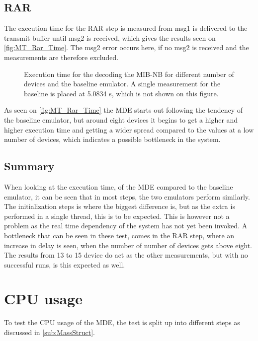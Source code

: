 \subsection{RAR}
The execution time for the RAR step is measured from msg1 is delivered to the transmit buffer until msg2 is received, which gives the results seen on \autoref{fig:MT_Rar_Time}. The msg2 error occurs here, if no msg2 is received and the measurements are therefore excluded. 

\begin{figure}[H]
\centering
\resizebox{0.5\textwidth}{!}{
}
\caption{Execution time for the decoding the MIB-NB for different number of devices and the baseline emulator. A single measurement for the baseline is placed at 5.0834 s, which is not shown on this figure.}
\label{fig:MT_Rar_Time}
\end{figure}

As seen on \autoref{fig:MT_Rar_Time} the MDE starts out following the tendency of the baseline emulator, but around eight devices it begins to get a higher and higher execution time and getting a wider spread compared to the values at a low number of devices, which indicates a possible bottleneck in the system.

\subsection{Summary}
When looking at the execution time, of the MDE compared to the baseline emulator, it can be seen that in most steps, the two emulators perform similarly. The initialization steps is where the biggest difference is, but as the extra is performed in a single thread, this is to be expected. This is however not a problem as the real time dependency of the system has not yet been invoked. A bottleneck that can be seen in these test, comes in the RAR step, where an increase in delay is seen, when the number of number of devices gets above eight. The results from 13 to 15 device do act as the other measurements, but with no successful runs, is this expected as well. 


\section{CPU usage}
To test the CPU usage of the MDE, the test is split up into different steps as discussed in \autoref{sub:MassStruct}. 

